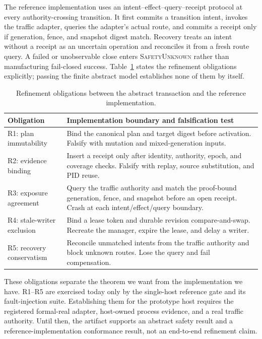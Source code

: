 \documentclass[letterpaper,twocolumn,10pt]{article}
\begin{document}
The reference implementation uses an intent--effect--query--receipt protocol
at every authority-crossing transition.  It first commits a transition intent,
invokes the traffic adapter, queries the adapter's actual route, and commits a
receipt only if generation, fence, and snapshot digest match.  Recovery treats
an intent without a receipt as an uncertain operation and reconciles it from a
fresh route query.  A failed or unobservable close enters \textsc{SafetyUnknown}
rather than manufacturing fail-closed success.  Table~\ref{tab:refinement}
states the refinement obligations explicitly; passing the finite abstract
model establishes none of them by itself.

\begin{table}[t]
\centering\small
\caption{Refinement obligations between the abstract transaction and the
reference implementation.}
\label{tab:refinement}
\begin{tabularx}{\columnwidth}{@{}lX@{}}
\toprule
Obligation & Implementation boundary and falsification test \\
\midrule
R1: plan immutability & Bind the canonical plan and target digest before
activation.  Falsify with mutation and mixed-generation inputs. \\
R2: evidence binding & Insert a receipt only after identity, authority, epoch,
and coverage checks.  Falsify with replay, source substitution, and PID reuse. \\
R3: exposure agreement & Query the traffic authority and match the proof-bound
generation, fence, and snapshot before an open receipt.  Crash at each
intent/effect/query boundary. \\
R4: stale-writer exclusion & Bind a lease token and durable revision
compare-and-swap.  Recreate the manager, expire the lease, and delay a writer. \\
R5: recovery conservatism & Reconcile unmatched intents from the traffic
authority and block unknown routes.  Lose the query and fail compensation. \\
\bottomrule
\end{tabularx}
\end{table}

These obligations separate the theorem we want from the implementation we
have.  R1--R5 are exercised today only by the single-host reference gate and
its fault-injection suite.  Establishing them for the prototype host requires the
registered formal-real adapter, host-owned process evidence, and a real traffic
authority.  Until then, the artifact supports an abstract safety result and a
reference-implementation conformance result, not an end-to-end refinement
claim.
\end{document}
